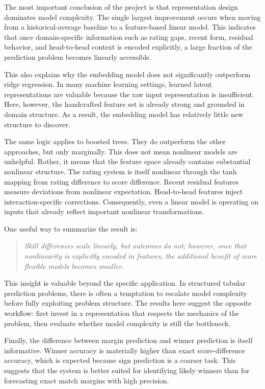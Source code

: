 \documentclass[10pt,twocolumn]{article}
\begin{document}
The most important conclusion of the project is that representation design dominates model complexity. The single largest improvement occurs when moving from a historical-average baseline to a feature-based linear model. This indicates that once domain-specific information such as rating gaps, recent form, residual behavior, and head-to-head context is encoded explicitly, a large fraction of the prediction problem becomes linearly accessible.

This also explains why the embedding model does not significantly outperform ridge regression. In many machine learning settings, learned latent representations are valuable because the raw input representation is insufficient. Here, however, the handcrafted feature set is already strong and grounded in domain structure. As a result, the embedding model has relatively little new structure to discover.

The same logic applies to boosted trees. They do outperform the other approaches, but only marginally. This does not mean nonlinear models are unhelpful. Rather, it means that the feature space already contains substantial nonlinear structure. The rating system is itself nonlinear through the tanh mapping from rating difference to score difference. Recent residual features measure deviations from nonlinear expectation. Head-to-head features inject interaction-specific corrections. Consequently, even a linear model is operating on inputs that already reflect important nonlinear transformations.

One useful way to summarize the result is:
\begin{quote}
    \emph{Skill differences scale linearly, but outcomes do not; however, once that nonlinearity is explicitly encoded in features, the additional benefit of more flexible models becomes smaller.}
\end{quote}

This insight is valuable beyond the specific application. In structured tabular prediction problems, there is often a temptation to escalate model complexity before fully exploiting problem structure. The results here suggest the opposite workflow: first invest in a representation that respects the mechanics of the problem, then evaluate whether model complexity is still the bottleneck.

Finally, the difference between margin prediction and winner prediction is itself informative. Winner accuracy is materially higher than exact score-difference accuracy, which is expected because sign prediction is a coarser task. This suggests that the system is better suited for identifying likely winners than for forecasting exact match margins with high precision.
\end{document}
